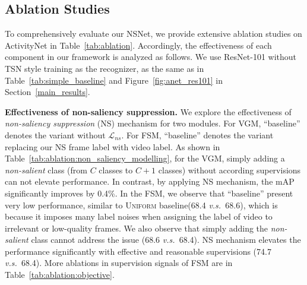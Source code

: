 \documentclass[runningheads]{llncs}
\newcommand{\figref}[1]{Figure~\ref{#1}}
\newcommand{\tabref}[1]{Table~\ref{#1}}
\newcommand{\secref}[1]{Section~\ref{#1}}
\def\vs{\emph{v.s.~}}
\begin{document}
\begin{table*}[t]
\hfill
\begin{subtable}[th]{0.45\textwidth}
\centering
\caption{Results of FS module with different learning objectives.}
\label{tab:ablation:objective}
\renewcommand{\arraystretch}{0.95}
\setlength{\tabcolsep}{6.0pt}
\end{subtable}
\end{table*}
 \subsection{Ablation Studies}
To comprehensively evaluate our NSNet, we provide extensive ablation studies on ActivityNet in \tabref{tab:ablation}. 
Accordingly, the effectiveness of each component in our framework is analyzed as follows. We use ResNet-101 without TSN style training as the recognizer, as the same as in \tabref{tab:simple_baseline} and \figref{fig:anet_res101} in \secref{main_results}.


\noindent\textbf{Effectiveness of non-saliency suppression.} 
We explore the effectiveness of \emph{non-saliency suppression} (NS) mechanism for two modules. For VGM, ``baseline'' denotes the variant without $\mathcal{L}_{ns}$. For FSM, ``baseline'' denotes the variant replacing our NS frame label with video label.  As shown in \tabref{tab:ablation:non_saliency_modelling}, for the VGM, simply adding a \textit{non-salient} class (from $C$ classes to $C+1$ classes) without according supervisions can not elevate performance. In contrast, by applying NS mechanism, the mAP significantly improves by 0.4\%. In the FSM, we observe that ``baseline'' present very low performance, similar to \textsc{Uniform} baseline(68.4 \vs 68.6), which is because it imposes many label noises when assigning the label of video to irrelevant or low-quality frames. We also observe that simply adding the \emph{non-salient} class cannot address the issue (68.6 \vs 68.4). NS mechanism elevates the performance significantly with effective and reasonable supervisions (74.7 \vs 68.4). More ablations in supervision signals of FSM are in \tabref{tab:ablation:objective}.
\end{document}
